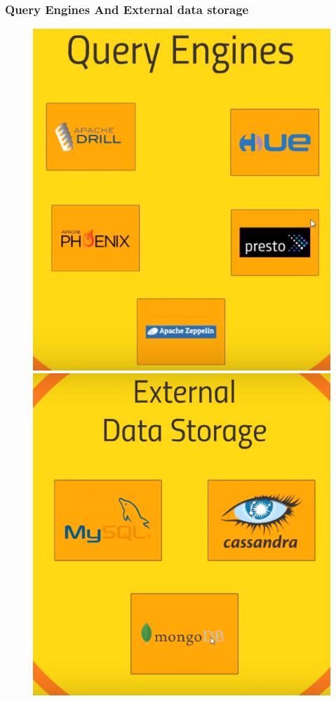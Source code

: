 \documentclass{beamer}
\begin{document}
\begin{frame}
\frametitle{Query Engines And External data storage}
\begin{figure}
	\includegraphics[scale=0.45]{QueryEngines}
	\includegraphics[scale=0.45]{ExternalDataStorage}
\end{figure}
\end{frame}
\end{document}
